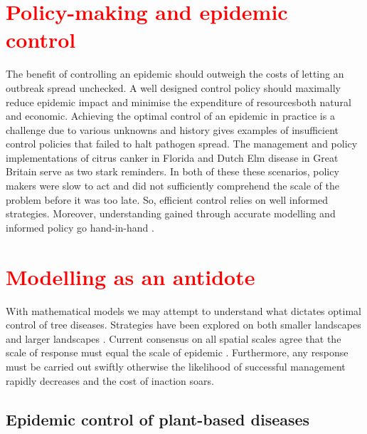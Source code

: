 \section{\textcolor{red}{Policy-making and epidemic control}}


The benefit of controlling an epidemic should outweigh the costs of letting an outbreak spread unchecked. A well designed control policy should maximally reduce epidemic impact and minimise the expenditure of resources\textemdash both natural and economic. Achieving the optimal control of an epidemic in practice is a challenge due to various unknowns \cite{13-challenges} and history gives examples of insufficient control policies that failed to halt pathogen spread. The management and policy implementations of citrus canker in Florida \cite{schubert2001meeting} and Dutch Elm disease in Great Britain \cite{dutch-elm-mismanage} serve as two stark reminders. In both of these these scenarios, policy makers were slow to act and did not sufficiently comprehend the scale of the problem before it was too late. So, efficient control relies on well informed strategies. Moreover, understanding gained through accurate modelling and informed policy go hand-in-hand \cite{jones2020modelling}.\\

\section{\textcolor{red}{Modelling as an antidote}}
With mathematical models we may attempt to understand what dictates optimal control of tree diseases. Strategies have been explored on both smaller landscapes \cite{WEBIDEMICS, risk-potential-control} and larger landscapes \cite{large-scale-control, large-scale-control2}. Current consensus on all spatial scales agree that the scale of response must equal the scale of epidemic \cite{control-scale-matching}. Furthermore, any response must be carried out swiftly otherwise the likelihood of successful management rapidly decreases and the cost of inaction soars.

\subsection{Epidemic control of plant-based diseases}

